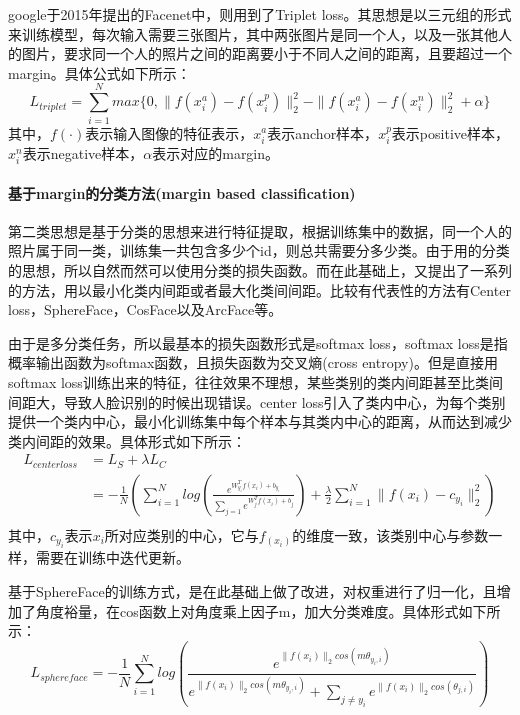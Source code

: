 google于2015年提出的Facenet中，则用到了Triplet loss。其思想是以三元组的形式来训练模型，每次输入需要三张图片，其中两张图片是同一个人，以及一张其他人的图片，要求同一个人的照片之间的距离要小于不同人之间的距离，且要超过一个margin。具体公式如下所示：
\[L_{triplet}=\sum_{i=1}^{N}max\{0, \parallel f(x_i^a) - f(x_i^p) \parallel_2^2 - \parallel f(x_i^a) - f(x_i^n) \parallel_2^2 + \alpha \}\]
其中，$f(\cdot)$表示输入图像的特征表示，$x_i^a$表示anchor样本，$x_i^p$表示positive样本，$x_i^n$表示negative样本，$\alpha$表示对应的margin。

\paragraph{基于margin的分类方法(margin based classification)}
第二类思想是基于分类的思想来进行特征提取，根据训练集中的数据，同一个人的照片属于同一类，训练集一共包含多少个id，则总共需要分多少类。由于用的分类的思想，所以自然而然可以使用分类的损失函数。而在此基础上，又提出了一系列的方法，用以最小化类内间距或者最大化类间间距。比较有代表性的方法有Center loss\cite{wen2016discriminative}，SphereFace\cite{liu2017sphereface}，CosFace\cite{wang2018cosface}以及ArcFace\cite{deng2019arcface}等。

由于是多分类任务，所以最基本的损失函数形式是softmax loss，softmax loss是指概率输出函数为softmax函数，且损失函数为交叉熵(cross entropy)。但是直接用softmax loss训练出来的特征，往往效果不理想，某些类别的类内间距甚至比类间间距大，导致人脸识别的时候出现错误。center loss引入了类内中心，为每个类别提供一个类内中心，最小化训练集中每个样本与其类内中心的距离，从而达到减少类内间距的效果。具体形式如下所示：
\begin{equation*}
\begin{split}
L_{centerloss}&=L_S + \lambda L_C \\
&=-\frac{1}{N}(\sum_{i=1}^{N}log(\frac{e^{W_{y_i}^T f(x_i) + b_{y_i}}}{\sum_{j=1}e^{W_j^T f(x_i) + b_j}}) + \frac{\lambda}{2}\sum_{i=1}^{N}\parallel f(x_i) - c_{y_i}\parallel_2^2) \\
\end{split}
\end{equation*}
其中，$c_{y_i}$表示$x_i$所对应类别的中心，它与$f_(x_i)$的维度一致，该类别中心与参数一样，需要在训练中迭代更新。

基于SphereFace的训练方式，是在此基础上做了改进，对权重进行了归一化，且增加了角度裕量，在cos函数上对角度乘上因子m，加大分类难度。具体形式如下所示：
\[L_{sphereface}=-\frac{1}{N}\sum_{i=1}^{N}log(\frac{e^{{\parallel f(x_i) \parallel_2}cos(m\theta_{y_i,i})}}{e^{{\parallel f(x_i) \parallel_2}cos(m\theta_{y_i,i})} + \sum_{j \ne y_i}e^{{\parallel f(x_i) \parallel_2}cos(\theta_{j,i})}})\]

